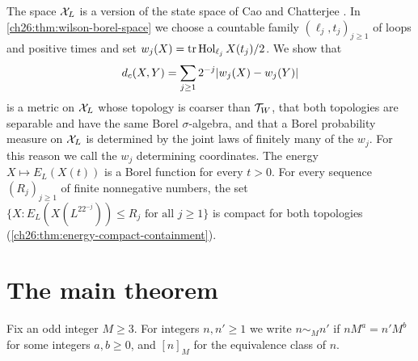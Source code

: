 The space $\mathcal X_L$ is a version of the state space of Cao and Chatterjee \cite{CCState2023v4}. In \cref{ch26:thm:wilson-borel-space} we choose a countable family $(\ell_j,t_j)_{j\ge1}$ of loops and positive times and set $w_j(X)=\operatorname{tr}\operatorname{Hol}_{\ell_j}X(t_j)/2$. We show that
\[
 d_c(X,Y)=\sum_{j\ge1}2^{-j}\lvert w_j(X)-w_j(Y)\rvert
\]
is a metric on $\mathcal X_L$ whose topology is coarser than $\mathcal T_W$, that both topologies are separable and have the same Borel $\sigma$-algebra, and that a Borel probability measure on $\mathcal X_L$ is determined by the joint laws of finitely many of the $w_j$. For this reason we call the $w_j$ determining coordinates. The energy $X\mapsto E_L(X(t))$ is a Borel function for every $t>0$. For every sequence $(R_j)_{j\ge1}$ of finite nonnegative numbers, the set $\{X:E_L(X(L^22^{-j}))\le R_j\text{ for all }j\ge1\}$ is compact for both topologies (\cref{ch26:thm:energy-compact-containment}).

\section{The main theorem}\label{s2:main}

Fix an odd integer $M\ge3$. For integers $n,n'\ge1$ we write $n\sim_Mn'$ if $nM^a=n'M^b$ for some integers $a,b\ge0$, and $[n]_M$ for the equivalence class of $n$.

